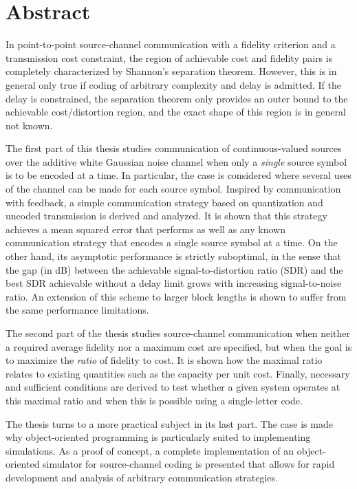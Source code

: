 \chapter*{Abstract}
\nocite{KleinerR2009a}



In point-to-point source-channel communication with a fidelity criterion and a transmission cost constraint, the region of achievable cost and fidelity pairs is completely characterized by Shannon's separation theorem. However, this is in general only true if coding of arbitrary complexity and delay is admitted. If the delay is constrained, the separation theorem only provides an outer bound to the achievable cost\slash distortion region, and the exact shape of this region is in general not known.

The first part of this thesis studies communication of continuous-valued sources
over the additive white Gaussian noise channel when only a \emph{single} source
symbol is to be encoded at a time. In particular, the case is considered where
several uses of the channel can be made for each source symbol. Inspired by
communication with feedback, a simple communication strategy based on
quantization and uncoded transmission is derived and analyzed. It is shown that
this strategy achieves a mean squared error that performs as well as any known
communication strategy that encodes a single source symbol at a time. On the
other hand, its asymptotic performance is strictly suboptimal, in the sense that
the gap (in dB) between the achievable signal-to-distortion ratio (SDR) and the
best SDR achievable without a delay limit grows with increasing signal-to-noise
ratio. An extension of this scheme to larger block lengths is shown to suffer
from the same performance limitations. 

The second part of the thesis studies source-channel communication when neither
a required average fidelity nor a maximum cost are specified, but when the goal
is to maximize the \emph{ratio} of fidelity to cost. It is shown how the
maximal ratio relates to existing quantities such as the capacity per unit cost.
Finally, necessary and sufficient conditions are derived to test whether a given
system operates at this maximal ratio and when this is possible using a
single-letter code.

The thesis turns to a more practical subject in its last part. The case is made why object-oriented programming is particularly suited to implementing simulations. As a proof of concept, a complete implementation of an object-oriented simulator for source-channel coding is presented that allows for rapid development and analysis of arbitrary communication strategies.
